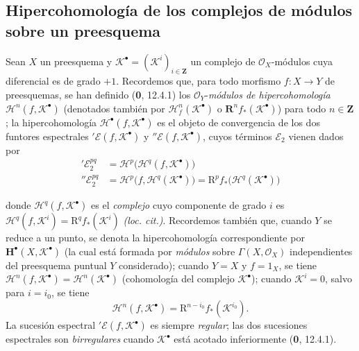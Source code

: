 \subsection{Hipercohomología de los complejos de módulos sobre un preesquema}
\label{subsection:III.6.2}
\label{subsection:III.6.2.fr}

\begin{env}[6.2.1]
Sean $X$ un preesquema y
$\mathscr K^\bullet=(\mathscr K^i)_{i\in\mathbf Z}$ un complejo de
$\mathscr O_X$-módulos cuya diferencial es de grado $+1$.
Recordemos que, para todo morfismo $f:X\to Y$ de preesquemas, se han definido
(\textbf 0, 12.4.1) los $\mathscr O_Y$-\emph{módulos de hipercohomología}
$\mathscr H^n(f,\mathscr K^\bullet)$ (denotados también por
$\mathscr H_f^n(\mathscr K^\bullet)$ o
$\mathbf R^n f_*(\mathscr K^\bullet)$) para todo $n\in\mathbf Z$;
la hipercohomología $\mathscr H^\bullet(f,\mathscr K^\bullet)$ es el objeto de
convergencia de los dos funtores espectrales
$'\mathscr E(f,\mathscr K^\bullet)$ y
$''\mathscr E(f,\mathscr K^\bullet)$, cuyos términos $\mathscr E_2$ vienen
dados por
\begin{align}
  '\mathscr E_2^{pq}
    &=\mathscr H^p\bigl(\mathscr H^q(f,\mathscr K^\bullet)\bigr)
    \tag{6.2.1.1}\label{III.6.2.1.1.fr}\\
  ''\mathscr E_2^{pq}
    &=\mathscr H^p\bigl(f,\mathscr H^q(\mathscr K^\bullet)\bigr)
      =\mathrm R^p f_*\bigl(\mathscr H^q(\mathscr K^\bullet)\bigr)
    \tag{6.2.1.2}\label{III.6.2.1.2.fr}
\end{align}


donde $\mathscr H^q(f,\mathscr K^\bullet)$ es el \emph{complejo} cuyo componente de
grado $i$ es
$\mathscr H^q(f,\mathscr K^i)=\mathrm R^q f_*(\mathscr K^i)$ \emph{(loc. cit.)}.
Recordemos también que, cuando $Y$ se reduce a un punto, se denota la
hipercohomología correspondiente por $\mathbf H^\bullet(X,\mathscr K^\bullet)$
(la cual está formada por \emph{módulos} sobre $\Gamma(X,\mathscr O_X)$ independientes
del preesquema puntual $Y$ considerado); cuando $Y=X$ y $f=1_X$, se tiene
$\mathscr H^n(f,\mathscr K^\bullet)=\mathscr H^n(\mathscr K^\bullet)$
(cohomología del complejo $\mathscr K^\bullet$); cuando
$\mathscr K^i=0$, salvo para $i=i_0$, se tiene
\[
  \mathscr H^n(f,\mathscr K^\bullet)
    =\mathrm R^{n-i_0}f_*(\mathscr K^{i_0}).
\]
La sucesión espectral $'\mathscr E(f,\mathscr K^\bullet)$ es siempre
\emph{regular}; las dos sucesiones espectrales son \emph{birregulares} cuando
$\mathscr K^\bullet$ está acotado inferiormente (\textbf 0, 12.4.1).


\end{env}
